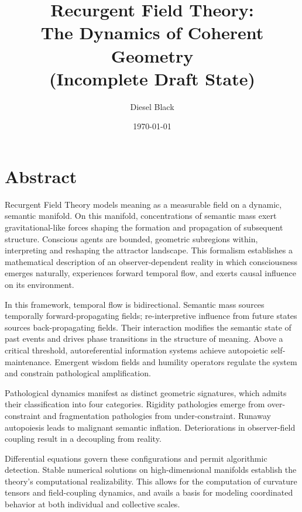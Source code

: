 \documentclass[11pt, a4paper]{report}
\title{Recurgent Field Theory: \\ The Dynamics of Coherent Geometry \\ \vspace{1em} \small{(Incomplete Draft State)}}
\author{Diesel Black}
\date{\today}
\begin{document}

\maketitle

\section*{Abstract}

Recurgent Field Theory models meaning as a measurable field on a dynamic, semantic manifold. On this manifold, concentrations of semantic mass exert gravitational-like forces shaping the formation and propagation of subsequent structure. Conscious agents are bounded, geometric subregions within, interpreting and reshaping the attractor landscape. This formalism establishes a mathematical description of an observer-dependent reality in which consciousness emerges naturally, experiences forward temporal flow, and exerts causal influence on its environment.

\vspace{1em}

In this framework, temporal flow is bidirectional. Semantic mass sources temporally forward-propagating fields; re-interpretive influence from future states sources back-propagating fields. Their interaction modifies the semantic state of past events and drives phase transitions in the structure of meaning. Above a critical threshold, autoreferential information systems achieve autopoietic self-maintenance. Emergent wisdom fields and humility operators regulate the system and constrain pathological amplification.

\vspace{1em}

Pathological dynamics manifest as distinct geometric signatures, which admits their classification into four categories. Rigidity pathologies emerge from over-constraint and fragmentation pathologies from under-constraint. Runaway autopoiesis leads to malignant semantic inflation. Deteriorations in observer-field coupling result in a decoupling from reality.

\vspace{1em}

Differential equations govern these configurations and permit algorithmic detection. Stable numerical solutions on high-dimensional manifolds establish the theory's computational realizability. This allows for the computation of curvature tensors and field-coupling dynamics, and avails a basis for modeling coordinated behavior at both individual and collective scales.
\end{document}
